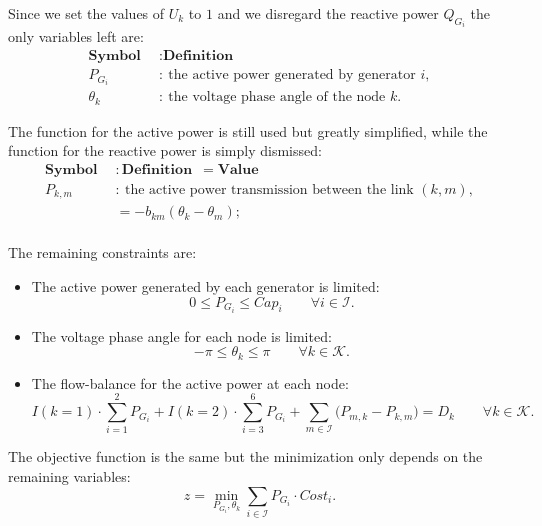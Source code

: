 \vspace{3mm}
\noindent
Since we set the values of $U_k$ to $1$ and we disregard the reactive power $Q_{G_i}$ the only variables left are:
\begin{align*}
\textbf{Symbol} \enspace &: \textbf{Definition}\\
P_{G_i} &: \ \text{the active power generated by generator } i, \\
\theta_k &: \ \text{the voltage phase angle of the node } k. 
\end{align*}

\vspace{3mm}
\noindent
The function for the active power is still used but greatly simplified, while the function for the reactive power is simply dismissed:
\begin{align*}
\textbf{Symbol} \enspace &: \textbf{Definition} \enspace = \textbf{Value}\\
P_{k,m} &: \ \text{the active power transmission between the link } (k,m), \\
        &= − b_{km} (\theta_k − \theta_m);\\
\end{align*}

\newpage
\noindent
The remaining constraints are: 
\begin{itemize}
    \item The active power generated by each generator is limited:
    \begin{equation*}
        0 \leq P_{G_i} \leq Cap_i  \qquad \forall i \in \mathcal{I}.
    \end{equation*}
    
    \item The voltage phase angle for each node is limited:
    \begin{equation*}
        -\pi \leq \theta_k \leq \pi  \qquad \forall k \in \mathcal{K}.
    \end{equation*}
    
    \item The flow-balance for the active power at each node:
    \begin{equation*}
        I(k = 1) \cdot \sum_{i = 1}^{2} P_{G_i} + I(k = 2) \cdot \sum_{i = 3}^{6} P_{G_i} + \sum_{m \in \mathcal{I}} \big( P_{m,k} - P_{k,m} \big) = D_k \qquad \forall k \in \mathcal{K}.
    \end{equation*}
    
\end{itemize}

\vspace{3mm}
\noindent
The objective function is the same but the minimization only depends on the remaining variables:
\begin{equation*}
    z = \min_{P_{G_i}, \theta_k} \sum_{i \in \mathcal{I}} P_{G_i} \cdot Cost_i.
\end{equation*}



